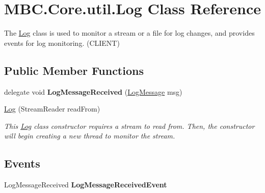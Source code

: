 \hypertarget{class_m_b_c_1_1_core_1_1util_1_1_log}{\section{M\-B\-C.\-Core.\-util.\-Log Class Reference}
\label{class_m_b_c_1_1_core_1_1util_1_1_log}
}


The \hyperlink{class_m_b_c_1_1_core_1_1util_1_1_log}{Log} class is used to monitor a stream or a file for log changes, and provides events for log monitoring. (C\-L\-I\-E\-N\-T) 


\subsection*{Public Member Functions}
\begin{DoxyCompactItemize}
\item 
\hypertarget{class_m_b_c_1_1_core_1_1util_1_1_log_a8af64f74500a37275589f3503d90279d}{delegate void {\bfseries Log\-Message\-Received} (\hyperlink{class_m_b_c_1_1_core_1_1util_1_1_log_message}{Log\-Message} msg)}\label{class_m_b_c_1_1_core_1_1util_1_1_log_a8af64f74500a37275589f3503d90279d}

\item 
\hypertarget{class_m_b_c_1_1_core_1_1util_1_1_log_a2cd8fbd24c6339b8d9c4855476dc29a1}{\hyperlink{class_m_b_c_1_1_core_1_1util_1_1_log_a2cd8fbd24c6339b8d9c4855476dc29a1}{Log} (Stream\-Reader read\-From)}\label{class_m_b_c_1_1_core_1_1util_1_1_log_a2cd8fbd24c6339b8d9c4855476dc29a1}

\begin{DoxyCompactList}\small\item\em This \hyperlink{class_m_b_c_1_1_core_1_1util_1_1_log}{Log} class constructor requires a stream to read from. Then, the constructor will begin creating a new thread to monitor the stream.\end{DoxyCompactList}\end{DoxyCompactItemize}
\subsection*{Events}
\begin{DoxyCompactItemize}
\item 
\hypertarget{class_m_b_c_1_1_core_1_1util_1_1_log_a536188a88d12672bb3489b9c34784831}{Log\-Message\-Received {\bfseries Log\-Message\-Received\-Event}}\label{class_m_b_c_1_1_core_1_1util_1_1_log_a536188a88d12672bb3489b9c34784831}

\end{DoxyCompactItemize}


